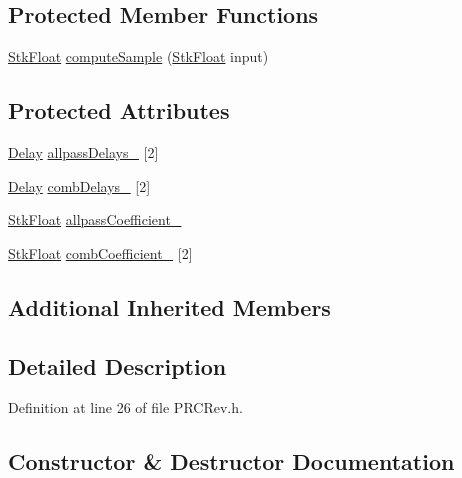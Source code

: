 \subsection*{Protected Member Functions}
\begin{DoxyCompactItemize}
\item 
\hyperlink{namespace_nyq_a044fa20a706520a617bbbf458a7db7e4}{Stk\+Float} \hyperlink{class_nyq_1_1_p_r_c_rev_ae5b8256b43d379fe0345b24bed7f40fc}{compute\+Sample} (\hyperlink{namespace_nyq_a044fa20a706520a617bbbf458a7db7e4}{Stk\+Float} input)
\end{DoxyCompactItemize}
\subsection*{Protected Attributes}
\begin{DoxyCompactItemize}
\item 
\hyperlink{class_nyq_1_1_delay}{Delay} \hyperlink{class_nyq_1_1_p_r_c_rev_a1e366fb1db4cfc7c0157fddb42db57f3}{allpass\+Delays\+\_\+} \mbox{[}2\mbox{]}
\item 
\hyperlink{class_nyq_1_1_delay}{Delay} \hyperlink{class_nyq_1_1_p_r_c_rev_aec6c008b05bd56f04a4990718a33d232}{comb\+Delays\+\_\+} \mbox{[}2\mbox{]}
\item 
\hyperlink{namespace_nyq_a044fa20a706520a617bbbf458a7db7e4}{Stk\+Float} \hyperlink{class_nyq_1_1_p_r_c_rev_a83cd09478ecc1a569b39596f57538084}{allpass\+Coefficient\+\_\+}
\item 
\hyperlink{namespace_nyq_a044fa20a706520a617bbbf458a7db7e4}{Stk\+Float} \hyperlink{class_nyq_1_1_p_r_c_rev_a87d778e9df9fff26f4f93589ef5ab238}{comb\+Coefficient\+\_\+} \mbox{[}2\mbox{]}
\end{DoxyCompactItemize}
\subsection*{Additional Inherited Members}


\subsection{Detailed Description}


Definition at line 26 of file P\+R\+C\+Rev.\+h.



\subsection{Constructor \& Destructor Documentation}
